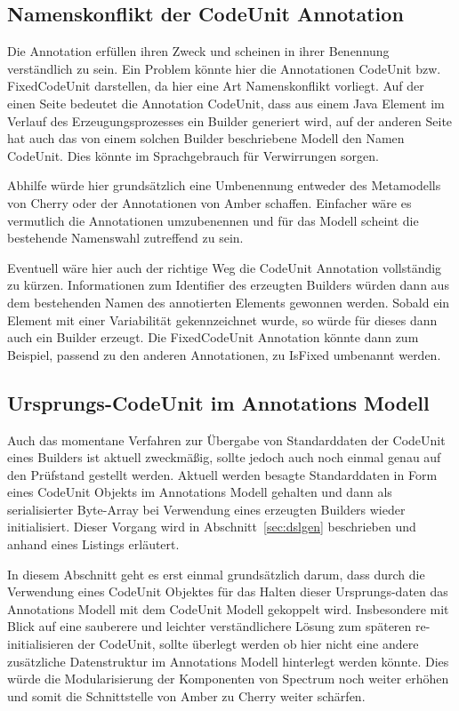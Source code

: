 \documentclass[12pt,oneside,a4paper,parskip]{scrbook}
\begin{document}
\subsection{Namenskonflikt der CodeUnit Annotation}

Die Annotation erfüllen ihren Zweck und scheinen in ihrer Benennung verständlich zu sein. Ein Problem könnte hier die Annotationen CodeUnit bzw. FixedCodeUnit darstellen, da hier eine Art Namenskonflikt vorliegt. Auf der einen Seite bedeutet die Annotation CodeUnit, dass aus einem Java Element im Verlauf des Erzeugungsprozesses ein Builder generiert wird, auf der anderen Seite hat auch das von einem solchen Builder beschriebene Modell den Namen CodeUnit. Dies könnte im Sprachgebrauch für Verwirrungen sorgen.

Abhilfe würde hier grundsätzlich eine Umbenennung entweder des Metamodells von Cherry oder der Annotationen von Amber schaffen. Einfacher wäre es vermutlich die Annotationen umzubenennen und für das Modell scheint die bestehende Namenswahl zutreffend zu sein.

Eventuell wäre hier auch der richtige Weg die CodeUnit Annotation vollständig zu kürzen. Informationen zum Identifier des erzeugten Builders würden dann aus dem bestehenden Namen des annotierten Elements gewonnen werden. Sobald ein Element mit einer Variabilität gekennzeichnet wurde, so würde für dieses dann auch ein Builder erzeugt. Die FixedCodeUnit Annotation könnte dann zum Beispiel, passend zu den anderen Annotationen, zu IsFixed umbenannt werden.

\subsection{Ursprungs-CodeUnit im Annotations Modell}

Auch das momentane Verfahren zur Übergabe von Standarddaten der CodeUnit eines Builders ist aktuell zweckmäßig, sollte jedoch auch noch einmal genau auf den Prüfstand gestellt werden. Aktuell werden besagte Standarddaten in Form eines CodeUnit Objekts im Annotations Modell gehalten und dann als serialisierter Byte-Array bei Verwendung eines erzeugten Builders wieder initialisiert. Dieser Vorgang wird in Abschnitt~\ref{sec:dslgen} beschrieben und anhand eines Listings erläutert.

In diesem Abschnitt geht es erst einmal grundsätzlich darum, dass durch die Verwendung eines CodeUnit Objektes für das Halten dieser Ursprungs-daten das Annotations Modell mit dem CodeUnit Modell gekoppelt wird. Insbesondere mit Blick auf eine sauberere und leichter verständlichere Lösung zum späteren re-initialisieren der CodeUnit, sollte überlegt werden ob hier nicht eine andere zusätzliche Datenstruktur im Annotations Modell hinterlegt werden könnte. Dies würde die Modularisierung der Komponenten von Spectrum noch weiter erhöhen und somit die Schnittstelle von Amber zu Cherry weiter schärfen.
\end{document}
